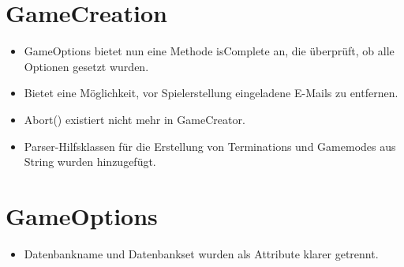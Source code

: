 \documentclass[a4paper]{scrreprt}
\begin{document}
\section{GameCreation}
\begin{itemize}
    \item GameOptions bietet nun eine Methode isComplete an, die überprüft, ob alle Optionen gesetzt wurden.
    \item Bietet eine Möglichkeit, vor Spielerstellung eingeladene E-Mails zu entfernen.
    \item Abort() existiert nicht mehr in GameCreator.
    \item Parser-Hilfsklassen für die Erstellung von Terminations und Gamemodes aus String wurden hinzugefügt.
\end{itemize}

\section{GameOptions}
\begin{itemize}
    \item Datenbankname und Datenbankset wurden als Attribute klarer getrennt.
\end{itemize}
\end{document}
